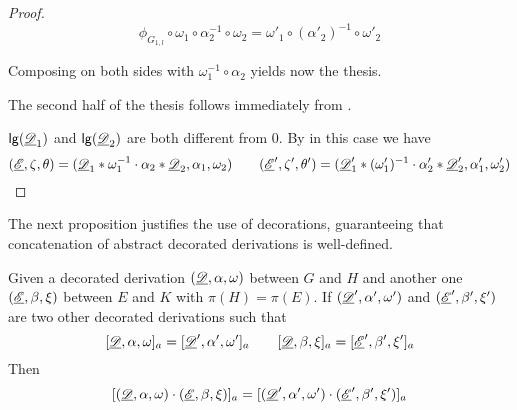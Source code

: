 \begin{proof}
	\[\phi_{G_{1,l}}\circ \omega_1\circ \alpha_2^{-1}\circ \omega_2=\omega'_1\circ (\alpha'_2)^{-1}\circ \omega'_2 \]
	 
	 Composing on both sides with $\omega^{-1}_1\circ \alpha_2$ yields now the thesis.
	 
The second half of the thesis follows immediately from .	
	
	\smallskip \noindent  $\mathsf{lg}(\underline{\mathscr{D}}_1)$ and $\mathsf{lg}(\underline{\mathscr{D}}_2)$ are both different from $0$. By  in this case we have
	\[(\underline{\mathscr{E}}, \zeta, \theta)=(\underline{\mathscr{D}}_1*\omega^{-1}_1 \cdot \alpha_2*\underline{\mathscr{D}}_2, \alpha_1,\omega_2 ) \qquad (\underline{\mathscr{E}}', \zeta', \theta')=(\underline{\mathscr{D}}'_1*(\omega'_1)^{-1} \cdot \alpha'_2*\underline{\mathscr{D}}'_2, \alpha'_1,\omega'_2 )\]
	
	
	
\end{proof}

The next proposition justifies the use of decorations, guaranteeing that concatenation of abstract decorated derivations is well-defined.
\begin{lemma}\label{lem:conc}
	Given a decorated derivation $(\underline{\mathscr{D}}, \alpha, \omega)$  between $G$ and $H$ and  another one $(\underline{\mathscr{E}}, \beta, \xi)$ between $E$ and $K$ with $\pi(H)=\pi(E)$. If  $(\underline{\mathscr{D}}', \alpha', \omega')$ and $(\underline{\mathscr{E}}', \beta', \xi')$ are two other decorated derivations such that
	\[[\underline{\mathscr{D}}, \alpha, \omega]_a = [\underline{\mathscr{D}}', \alpha', \omega']_a \qquad [\underline{\mathscr{D}}, \beta, \xi]_a=[\underline{\mathscr{E}}', \beta', \xi']_a\]
	Then
	\[[(\underline{\mathscr{D}}, \alpha, \omega)\cdot (\underline{\mathscr{E}}, \beta, \xi)]_a=[(\underline{\mathscr{D}}', \alpha', \omega')\cdot (\underline{\mathscr{E}}', \beta', \xi')]_a\]
\end{lemma}

